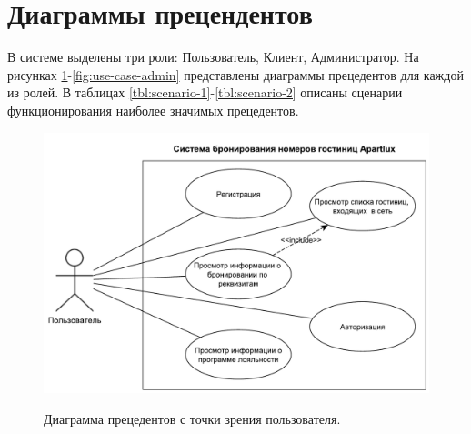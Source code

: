 \section*{Диаграммы прецендентов}
В системе выделены три роли: Пользователь, Клиент, Администратор. На рисунках \ref{fig:use-case-user}-\ref{fig:use-case-admin} представлены диаграммы прецедентов для каждой из ролей. В таблицах \ref{tbl:scenario-1}-\ref{tbl:scenario-2} описаны сценарии функционирования наиболее значимых прецедентов.  

\begin{figure}[h]
	\begin{center}
		{\includegraphics[scale = 0.6]{img/use-case/user.pdf}}
		\caption{Диаграмма прецедентов с точки зрения пользователя.}
		\label{fig:use-case-user}
	\end{center}
\end{figure}

\pagebreak

